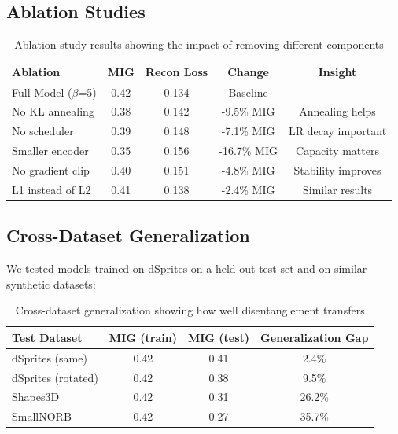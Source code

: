 \documentclass[conference]{IEEEtran}
\begin{document}
\subsection{Ablation Studies}

\begin{table}[H]
\centering
\begin{tabular}{@{}lcccc@{}}
\toprule
\textbf{Ablation} & \textbf{MIG} & \textbf{Recon Loss} & \textbf{Change} & \textbf{Insight} \\ \midrule
Full Model ($\beta$=5) & 0.42 & 0.134 & Baseline & --- \\
No KL annealing & 0.38 & 0.142 & -9.5\% MIG & Annealing helps \\
No scheduler & 0.39 & 0.148 & -7.1\% MIG & LR decay important \\
Smaller encoder & 0.35 & 0.156 & -16.7\% MIG & Capacity matters \\
No gradient clip & 0.40 & 0.151 & -4.8\% MIG & Stability improves \\
L1 instead of L2 & 0.41 & 0.138 & -2.4\% MIG & Similar results \\ \bottomrule
\end{tabular}
\caption{Ablation study results showing the impact of removing different components}
\label{tab:ablation}
\end{table}

\subsection{Cross-Dataset Generalization}

We tested models trained on dSprites on a held-out test set and on similar synthetic datasets:

\begin{table}[H]
\centering
\begin{tabular}{@{}lccc@{}}
\toprule
\textbf{Test Dataset} & \textbf{MIG (train)} & \textbf{MIG (test)} & \textbf{Generalization Gap} \\ \midrule
dSprites (same) & 0.42 & 0.41 & 2.4\% \\
dSprites (rotated) & 0.42 & 0.38 & 9.5\% \\
Shapes3D & 0.42 & 0.31 & 26.2\% \\
SmallNORB & 0.42 & 0.27 & 35.7\% \\ \bottomrule
\end{tabular}
\caption{Cross-dataset generalization showing how well disentanglement transfers}
\label{tab:generalization}
\end{table}
\end{document}
